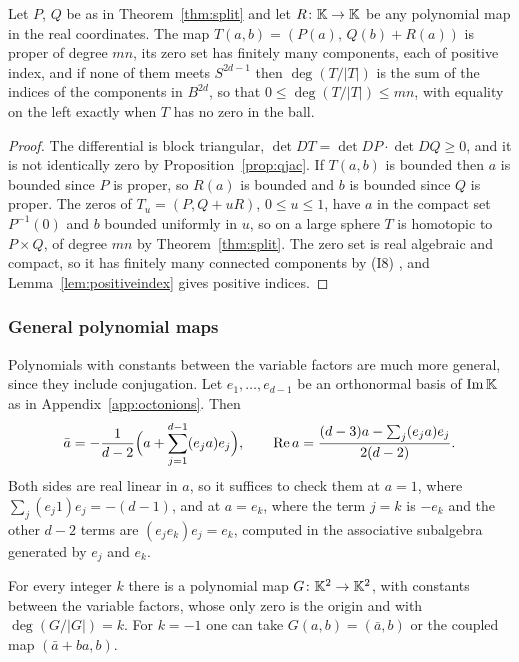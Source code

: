 \begin{theorem}\label{thm:triangular}
Let $P$, $Q$ be as in Theorem~\ref{thm:split} and let $R\colon\K\to\K$ be any polynomial map in the real coordinates. The map $T(a,b)=(P(a),\,Q(b)+R(a))$ is proper of degree $mn$, its zero set has finitely many components, each of positive index, and if none of them meets $S^{2d-1}$ then $\deg(T/|T|)$ is the sum of the indices of the components in $B^{2d}$, so that $0\le\deg(T/|T|)\le mn$, with equality on the left exactly when $T$ has no zero in the ball.
\end{theorem}

\begin{proof}
The differential is block triangular, $\det DT=\det DP\cdot\det DQ\ge0$, and it is not identically zero by Proposition~\ref{prop:qjac}. If $T(a,b)$ is bounded then $a$ is bounded since $P$ is proper, so $R(a)$ is bounded and $b$ is bounded since $Q$ is proper. The zeros of $T_u=(P,Q+uR)$, $0\le u\le1$, have $a$ in the compact set $P^{-1}(0)$ and $b$ bounded uniformly in $u$, so on a large sphere $T$ is homotopic to $P\times Q$, of degree $mn$ by Theorem~\ref{thm:split}. The zero set is real algebraic and compact, so it has finitely many connected components by (I8) \cite[Theorem~2.4.4]{BCR98}, and Lemma~\ref{lem:positiveindex} gives positive indices.
\end{proof}

\subsubsection{General polynomial maps}

Polynomials with constants between the variable factors are much more general, since they include conjugation. Let $e_1,\dots,e_{d-1}$ be an orthonormal basis of $\Imag\K$ as in Appendix~\ref{app:octonions}. Then
\begin{equation}\label{eq:conjword}
\bar a=-\frac1{d-2}\Bigl(a+\sum_{j=1}^{d-1}(e_ja)e_j\Bigr),\qquad \Re a=\frac{(d-3)a-\sum_{j}(e_ja)e_j}{2(d-2)} .
\end{equation}
Both sides are real linear in $a$, so it suffices to check them at $a=1$, where $\sum_j(e_j1)e_j=-(d-1)$, and at $a=e_k$, where the term $j=k$ is $-e_k$ and the other $d-2$ terms are $(e_je_k)e_j=e_k$, computed in the associative subalgebra generated by $e_j$ and $e_k$.

\begin{proposition}\label{prop:negative}
For every integer $k$ there is a polynomial map $G\colon\K^2\to\K^2$, with constants between the variable factors, whose only zero is the origin and with $\deg(G/|G|)=k$. For $k=-1$ one can take $G(a,b)=(\bar a,b)$ or the coupled map $(\bar a+ba,b)$.
\end{proposition}

